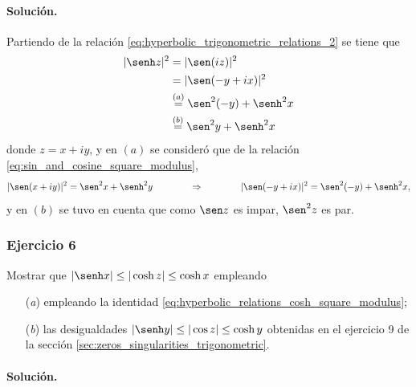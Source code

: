 \documentclass[a4paper]{report}
\begin{document}
\paragraph{Solución.} Partiendo de la relación \ref{eq:hyperbolic_trigonometric_relations_2} se tiene que 
\begin{align*}
 |\senh z|^2&=|\sen(iz)|^2\\
   &=|\sen(-y+ix)|^2\\
   &\overset{(a)}{=}\sen^2(-y)+\senh^2x\\
   &\overset{(b)}{=}\sen^2 y+\senh^2x
\end{align*}
donde \(z=x+iy\), y en \((a)\) se consideró que de la relación \ref{eq:sin_and_cosine_square_modulus},
\[
 |\sen(x+iy)|^2=\sen^2x+\senh^2y
 \qquad\qquad\Rightarrow\qquad\qquad
 |\sen(-y+ix)|^2=\sen^2(-y)+\senh^2x,
\]
y en \((b)\) se tuvo en cuenta que como \(\sen z\) es impar, \(\sen^2 z\) es par.

\subsubsection{Ejercicio 6}

Mostrar que \(|\senh x|\leq|\cosh z|\leq\cosh x\) empleando
\begin{enumerate}
 \item[(\textit{a})] empleando la identidad \ref{eq:hyperbolic_relations_cosh_square_modulus};
 \item[(\textit{b})] las desigualdades \(|\senh y|\leq|\cos z|\leq\cosh y\) obtenidas en el ejercicio 9 de la sección \ref{sec:zeros_singularities_trigonometric}.
\end{enumerate}

\paragraph{Solución.} 
\end{document}
